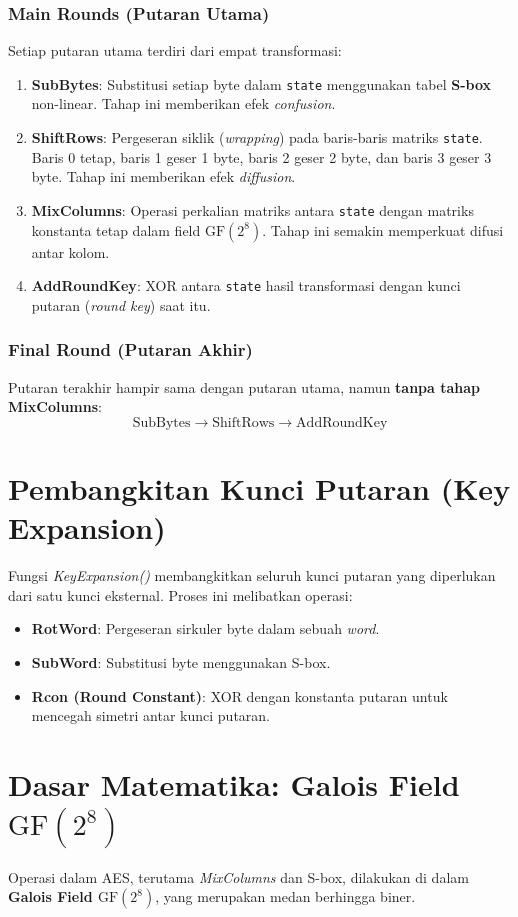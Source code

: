 \documentclass[../main.tex]{subfiles}
\begin{document}
\subsubsection{Main Rounds (Putaran Utama)}
Setiap putaran utama terdiri dari empat transformasi:
\begin{enumerate}
    \item \textbf{SubBytes}: Substitusi setiap byte dalam \texttt{state} menggunakan tabel \textbf{S-box} non-linear. Tahap ini memberikan efek \textit{confusion}.
    \item \textbf{ShiftRows}: Pergeseran siklik (\textit{wrapping}) pada baris-baris matriks \texttt{state}. Baris 0 tetap, baris 1 geser 1 byte, baris 2 geser 2 byte, dan baris 3 geser 3 byte. Tahap ini memberikan efek \textit{diffusion}.
    \item \textbf{MixColumns}: Operasi perkalian matriks antara \texttt{state} dengan matriks konstanta tetap dalam field $\text{GF}(2^8)$. Tahap ini semakin memperkuat difusi antar kolom.
    \item \textbf{AddRoundKey}: XOR antara \texttt{state} hasil transformasi dengan kunci putaran (\textit{round key}) saat itu.
\end{enumerate}

\subsubsection{Final Round (Putaran Akhir)}
Putaran terakhir hampir sama dengan putaran utama, namun \textbf{tanpa tahap MixColumns}:
\[ \text{SubBytes} \rightarrow \text{ShiftRows} \rightarrow \text{AddRoundKey} \]

\section{Pembangkitan Kunci Putaran (Key Expansion)}
Fungsi \textit{KeyExpansion()} membangkitkan seluruh kunci putaran yang diperlukan dari satu kunci eksternal. Proses ini melibatkan operasi:
\begin{itemize}
    \item \textbf{RotWord}: Pergeseran sirkuler byte dalam sebuah \textit{word}.
    \item \textbf{SubWord}: Substitusi byte menggunakan S-box.
    \item \textbf{Rcon (Round Constant)}: XOR dengan konstanta putaran untuk mencegah simetri antar kunci putaran.
\end{itemize}

\section{Dasar Matematika: Galois Field \texorpdfstring{$\text{GF}(2^8)$}{GF(2\textasciicircum8)}}
Operasi dalam AES, terutama \textit{MixColumns} dan S-box, dilakukan di dalam \textbf{Galois Field $\text{GF}(2^8)$}, yang merupakan medan berhingga biner.
\end{document}
